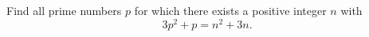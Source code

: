 Find all prime numbers $p$ for which there exists a positive integer $n$ with
\[
3p^2+p=n^2+3n .
\]
